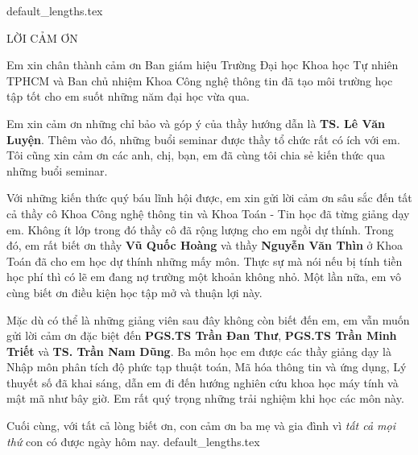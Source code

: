 \documentclass[class=report, crop=false]{standalone}
\begin{document}
	{default_lengths.tex}
	\hypertarget{acknowledgements}{}
	\thispagestyle{empty}
	\rmfamily\Large\bfseries
	\begin{center}
		LỜI CẢM ƠN
	\end{center}
	\normalsize\normalfont
	\par\noindent
	Em xin chân thành cảm ơn Ban giám hiệu Trường Đại học Khoa học Tự nhiên TPHCM và Ban chủ nhiệm Khoa Công nghệ thông tin đã tạo môi trường học tập tốt cho em suốt những năm đại học vừa qua.
	
	Em xin cảm ơn những chỉ bảo và góp ý của thầy hướng dẫn là \textbf{TS. Lê Văn Luyện}. Thêm vào đó, những buổi seminar được thầy tổ chức rất có ích với em. Tôi cũng xin cảm ơn các anh, chị, bạn, em đã cùng tôi chia sẻ kiến thức qua những buổi seminar.

	Với những kiến thức quý báu lĩnh hội được, em xin gửi lời cảm ơn sâu sắc đến tất cả thầy cô Khoa Công nghệ thông tin và Khoa Toán - Tin học đã từng giảng dạy em. Không ít lớp trong đó thầy cô đã rộng lượng cho em ngồi dự thính. Trong đó, em rất biết ơn thầy \textbf{Vũ Quốc Hoàng} và thầy \textbf{Nguyễn Văn Thìn} ở Khoa Toán đã cho em học dự thính những mấy môn. Thực sự mà nói nếu bị tính tiền học phí thì có lẽ em đang nợ trường một khoản không nhỏ. Một lần nữa, em vô cùng biết ơn điều kiện học tập mở và thuận lợi này.

	Mặc dù có thể là những giảng viên sau đây không còn biết đến em, em vẫn muốn gửi lời cảm ơn đặc biệt đến \textbf{PGS.TS Trần Đan Thư}, \textbf{PGS.TS Trần Minh Triết} và \textbf{TS. Trần Nam Dũng}. Ba môn học em được các thầy giảng dạy là Nhập môn phân tích độ phức tạp thuật toán, Mã hóa thông tin và ứng dụng, Lý thuyết số đã khai sáng, dẫn em đi đến hướng nghiên cứu khoa học máy tính và mật mã như bây giờ. Em rất quý trọng những trải nghiệm khi học các môn này.

	Cuối cùng, với tất cả lòng biết ơn, con cảm ơn ba mẹ và gia đình vì \emph{tất cả mọi thứ} con có được ngày hôm nay.
	\newpage
	{default_lengths.tex}
\end{document}
